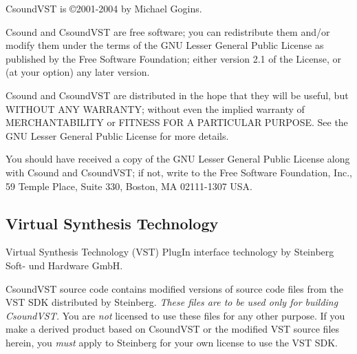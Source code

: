 \documentclass[10pt,letterpaper,onecolumn]{ltxguide}
\begin{document}
CsoundVST is \copyright 2001-2004 by Michael Gogins.

Csound and CsoundVST are free software; you can redistribute them and/or modify them under the terms of the GNU Lesser General Public License as published by the Free Software Foundation; either version 2.1 of the License, or (at your option) any later version.

Csound and CsoundVST are distributed in the hope that they will be useful, but WITHOUT ANY WARRANTY; without even the implied warranty of MERCHANTABILITY or FITNESS FOR A PARTICULAR PURPOSE.  See the GNU Lesser General Public License for more details.

You should have received a copy of the GNU Lesser General Public License along with Csound and CsoundVST; if not, write to the Free Software Foundation, Inc., 59 Temple Place, Suite 330, Boston, MA 02111-1307 USA.
\subsection{Virtual Synthesis Technology}
Virtual Synthesis Technology (VST) PlugIn interface technology by Steinberg Soft- und Hardware GmbH. 

CsoundVST source code contains modified versions of source code files from the VST SDK distributed by Steinberg. \emph{These files are to be used only for building CsoundVST.} You are \emph{not} licensed to use these files for any other purpose. If you make a derived product based on CsoundVST or the modified VST source files herein, you \emph{must} apply to Steinberg for your own license to use the VST SDK.
\end{document}
